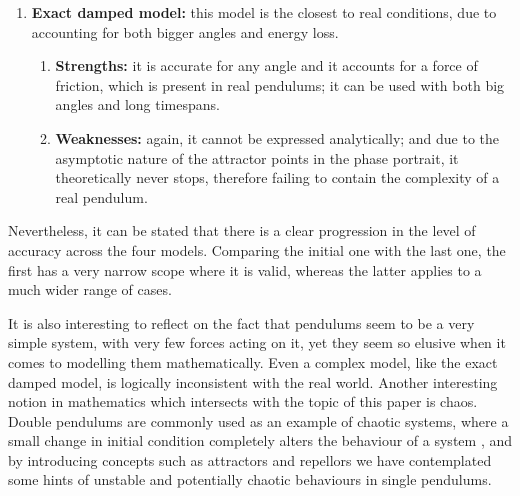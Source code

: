\documentclass[12pt, a4paper, titlepage]{article}
\theoremstyle{definition}
\numberwithin{equation}{section}
\theoremstyle{definition}
\theoremstyle{definition}
\begin{document}
\begin{enumerate}
\begin{enumerate}
\end{enumerate}
\item \textbf{Exact damped model:} this model is the closest to real conditions, due to accounting for both bigger angles and energy loss.
\begin{enumerate}
\item \textbf{Strengths:} it is accurate for any angle and it accounts for a force of friction, which is present in real pendulums; it can be used with both big angles and long timespans.
\item \textbf{Weaknesses:} again, it cannot be expressed analytically; and due to the asymptotic nature of the attractor points in the phase portrait, it theoretically never stops, therefore failing to contain the complexity of a real pendulum.
\end{enumerate}
\end{enumerate}
Nevertheless, it can be stated that there is a clear progression in the level of accuracy across the four models. Comparing the initial one with the last one, the first has a very narrow scope where it is valid, whereas the latter applies to a much wider range of cases.

It is also interesting to reflect on the fact that pendulums seem to be a very simple system, with very few forces acting on it, yet they seem so elusive when it comes to modelling them mathematically. Even a complex model, like the exact damped model, is logically inconsistent with the real world. Another interesting notion in mathematics which intersects with the topic of this paper is chaos. Double pendulums are commonly used as an example of chaotic systems, where a small change in initial condition completely alters the behaviour of a system {\parencite[p. 1044]{double}}, and by introducing concepts such as attractors and repellors we have contemplated some hints of unstable and potentially chaotic behaviours in single pendulums.
\end{document}
